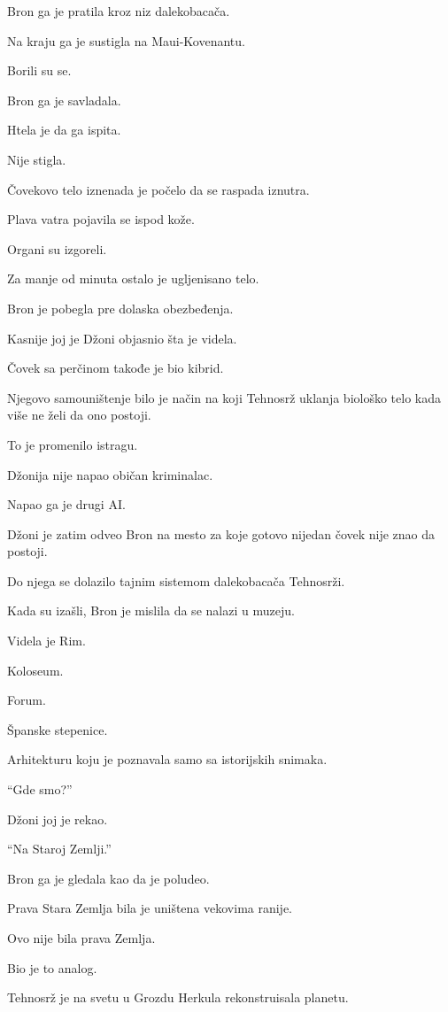 Bron ga je pratila kroz niz dalekobacača.

Na kraju ga je sustigla na Maui-Kovenantu.

Borili su se.

Bron ga je savladala.

Htela je da ga ispita.

Nije stigla.

Čovekovo telo iznenada je počelo da se raspada iznutra.

Plava vatra pojavila se ispod kože.

Organi su izgoreli.

Za manje od minuta ostalo je ugljenisano telo.

Bron je pobegla pre dolaska obezbeđenja.

Kasnije joj je Džoni objasnio šta je videla.

Čovek sa perčinom takođe je bio kibrid.

Njegovo samouništenje bilo je način na koji Tehnosrž uklanja biološko telo kada više ne želi da ono postoji.

To je promenilo istragu.

Džonija nije napao običan kriminalac.

Napao ga je drugi AI.

\bigskip

Džoni je zatim odveo Bron na mesto za koje gotovo nijedan čovek nije znao da postoji.

Do njega se dolazilo tajnim sistemom dalekobacača Tehnosrži.

Kada su izašli, Bron je mislila da se nalazi u muzeju.

Videla je Rim.

Koloseum.

Forum.

Španske stepenice.

Arhitekturu koju je poznavala samo sa istorijskih snimaka.

``Gde smo?''

Džoni joj je rekao.

``Na Staroj Zemlji.''

Bron ga je gledala kao da je poludeo.

Prava Stara Zemlja bila je uništena vekovima ranije.

Ovo nije bila prava Zemlja.

Bio je to analog.

Tehnosrž je na svetu u Grozdu Herkula rekonstruisala planetu.

